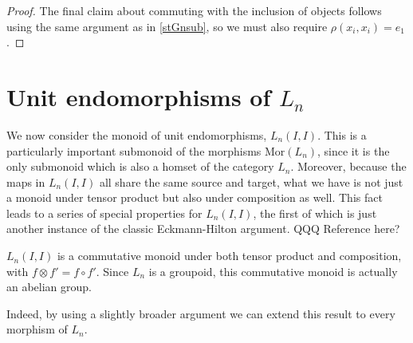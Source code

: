 \documentclass{amsbook} %
\numberwithin{section}{chapter}
\begin{document}
\begin{proof}
The final claim about commuting with the inclusion of objects follows using the same argument as in  \cref{stGnsub}, so we must also require $\rho(x_i, x_i) = e_1$.

\end{proof} 

\section{Unit endomorphisms of \texorpdfstring{$L_n$}{L_n}}

We now consider the monoid of unit endomorphisms, $L_n(I,I)$. This is a particularly important submonoid of the morphisms $\mathrm{Mor}(L_n)$, since it is the only submonoid which is also a homset of the category $L_n$. Moreover, because the maps in $L_n(I,I)$ all share the same source and target, what we have is not just a monoid under tensor product but also under composition as well. This fact leads to a series of special properties for $L_n(I,I)$, the first of which is just another instance of the classic Eckmann-Hilton argument. QQQ Reference here?

\begin{prop} \label{endcom} $L_n(I,I)$ is a commutative monoid under both tensor product and composition, with $f \otimes f' = f \circ f'$. Since $L_n$ is a groupoid, this commutative monoid is actually an abelian group.
\end{prop}

Indeed, by using a slightly broader argument we can extend this result to every morphism of $L_n$.
\end{document}
